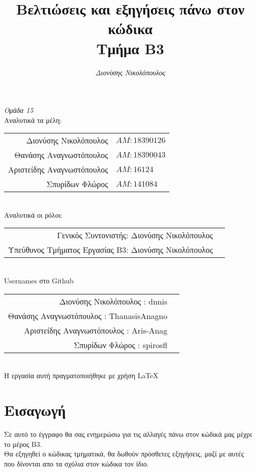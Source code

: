 \documentclass[14pt]{extarticle}
\title{\bf Βελτιώσεις και εξηγήσεις πάνω στον κώδικα \\ Τμήμα B3}
\author{
  \emph{Διονύσης Νικολόπουλος}
}
\begin{document}
\maketitle
\clearpage
\tableofcontents
\clearpage
  \begin{center}
    \large \emph{Ομάδα 15}
    \\
    Αναλυτικά τα μέλη:
\vspace{5mm}
  \begin{tabular}{r l}
    \\Διονύσης Νικολόπουλος & $AM: 18390126$
    \\Θανάσης Αναγνωστόπουλος & $AM: 18390043$
    \\Αριστείδης Αναγνωστόπουλος & $AM: 16124$
    \\Σπυρίδων Φλώρος & $AM: 141084$
  \end{tabular}
\vspace{5mm}
    \\
    Αναλυτικά οι ρόλοι:
    \\
\vspace{5mm}
  \begin{tabular}{r l}
    \small Γενικός Συντονιστής:   Διονύσης Νικολόπουλος
    \\
    \small Υπεύθυνος Τμήματος Εργασίας B3: Διονύσης Νικολόπουλος
  \end{tabular}
\vspace{5mm}
\\
  \textlatin{Usernames} στο \textlatin{Github}
\\
  \vspace{5mm}
  \begin{tabular}{r l}
    \small Διονύσης Νικολόπουλος : \textlatin{dnnis}
    \\
    \small Θανάσης Αναγνωστόπουλος : \textlatin{ThanasisAnagno}
    \\
    \small Αριστείδης Αναγνωστόπουλος : \textlatin{Aris-Anag}
    \\
    \small Σπυρίδων Φλώρος : \textlatin{spirosfl}
  \end{tabular}
  \\
\vspace*{\fill}
    \footnotesize{Η εργασία αυτή πραγματοποιήθηκε με χρήση \LaTeX}
  \end{center}
\clearpage
\section{Εισαγωγή}
Σε αυτό το έγγραφο θα σας ενημερώσω για τις αλλαγές πάνω στον κώδικά μας μέχρι
το μέρος Β3.
\\
Θα εξηγηθεί ο κώδικας τμηματικά, θα δωθούν πρόσθετες εξηγήσεις, μαζί με αυτές που
δίνονται απο τα σχόλια στον κώδικα τον ίδιο.
\\
\end{document}

